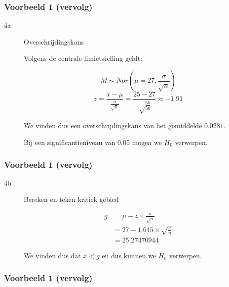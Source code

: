 \documentclass[aspectratio=169]{beamer}
\begin{document}
\begin{frame}
  \frametitle{Voorbeeld 1 (vervolg)}
  
  \begin{description}
    \item[4a] Overschrijdingskans
    
    Volgens de centrale limietstelling geldt:
    
    \[ M \sim Nor(\mu = 27, \frac{\sigma}{\sqrt{n}}) \]
    \[ z = \frac{\overline{x} - \mu}{\frac{\sigma}{\sqrt{n}}} = \frac{25-27}{\sqrt\frac{55}{50}} \approx -1.91\]
    
    We vinden dus een overschrijdingskans van het gemiddelde $0.0281$.
    
    
    Bij een significantieniveau van 0.05 mogen we $H_{0}$ verwerpen.
  \end{description}
  
\end{frame}

\begin{frame}
  \frametitle{Voorbeeld 1 (vervolg)}
  
  \begin{description}
    
    \item[4b] Bereken en teken kritiek gebied
    
    \begin{align*}
    g &= \mu - z \times \frac{\sigma}{\sqrt{n}} \\
    &= 27 - 1.645 \times \sqrt{\frac{\sigma}{n}} \\
    &= 25.27470944
    \end{align*}
    
    We vinden dus dat $\overline{x} < g$ en dus kunnen we $H_{0}$ verwerpen.
  \end{description}
\end{frame}

\begin{frame}
  \frametitle{Voorbeeld 1 (vervolg)}
  
  \bigskip
  \centering
\end{frame}
\end{document}
